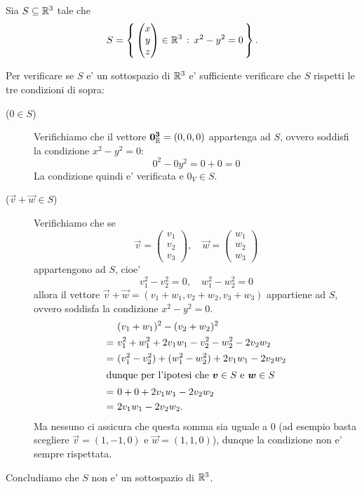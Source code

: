 \begin{example}
    Sia $S \subseteq \R^3$ tale che \[
        S = \set{ \begin{pmatrix}
            x \\ y \\ z
        \end{pmatrix} \in \R^3 \suchthat x^2 - y^2 = 0}.
    \]

    Per verificare se $S$ e' un sottospazio di $\R^3$ e' sufficiente verificare che $S$ rispetti le tre condizioni di sopra:
    \begin{description}
        \item[($0 \in S$)] Verifichiamo che il vettore $\vec{0_\R^3} = (0, 0, 0)$ appartenga ad $S$, ovvero soddisfi la condizione $x^2 - y^2 = 0$: \[
            0^2 - 0y^2 = 0 + 0 = 0
        \] La condizione quindi e' verificata e $0_V \in S$.
        \item[($\vec v + \vec w \in S$)] Verifichiamo che se \[
            \vec v = \begin{pmatrix}
                v_1 \\ v_2 \\ v_3
            \end{pmatrix}, \quad \vec w = \begin{pmatrix}
                w_1 \\ w_2 \\ w_3
            \end{pmatrix} 
        \] appartengono ad $S$, cioe' \[
            v_1^2 - v_2^2 = 0, \quad w_1^2 - w_2^2 = 0
        \] allora il vettore $\vec{v} + \vec{w} = (v_1+w_1, v_2+w_2, v_3+w_3)$ appartiene ad $S$, ovvero soddisfa la condizione $x^2 - y^2 = 0$. \begin{align*}
            &(v_1+w_1)^2 - (v_2+w_2)^2 \\
            =\ &v_1^2+w_1^2 + 2v_1w_1 -v_2^2-w_2^2-2v_2w_2 \\
            =\ &(v_1^2 - v_2^2) + (w_1^2 - w_2^2) + 2v_1w_1 -2v_2w_2\\
            \intertext{dunque per l'ipotesi che $\vec v \in S$ e $\vec w \in S$}
            =\ &0 + 0  + 2v_1w_1 -2v_2w_2\\
            =\ &2v_1w_1 -2v_2w_2.
        \end{align*}
        Ma nessuno ci assicura che questa somma sia uguale a $0$ (ad esempio basta scegliere $\vec v = (1, -1, 0)$ e $\vec w = (1, 1, 0)$), dunque la condizione non e' sempre rispettata.
    \end{description}
    Concludiamo che $S$ non e' un sottospazio di $\R^3$.
\end{example}

